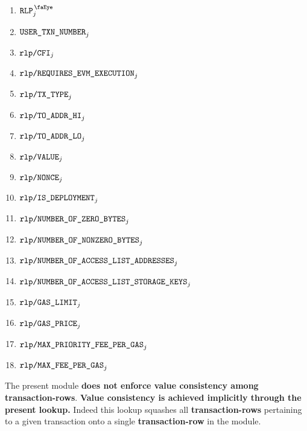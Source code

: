 \begin{description}
\begin{multicols}{2}
			\begin{enumerate}
				\item $\isUserTxnRlpView                        _{j}$
				\item $\texttt{USER}\texttt{\_}\texttt{TXN\_NUMBER}                   _{j}$
				\item $\texttt{rlp}\texttt{/}{\texttt{\texttt{CFI}}}                           _{j}$
				\item $\texttt{rlp}\texttt{/}{\texttt{\texttt{REQUIRES\_EVM\_EXECUTION}}}          _{j}$
				\item $\texttt{rlp}\texttt{/}{\texttt{TX\_TYPE}}                        _{j}$
				\item $\texttt{rlp}\texttt{/}{\texttt{TO\_ADDR\_HI}}                      _{j}$
				\item $\texttt{rlp}\texttt{/}{\texttt{TO\_ADDR\_LO}}                      _{j}$
				\item $\texttt{rlp}\texttt{/}{\texttt{VALUE}}                         _{j}$
				\item $\texttt{rlp}\texttt{/}{\texttt{NONCE}}                         _{j}$
				\item $\texttt{rlp}\texttt{/}{\texttt{IS\_DEPLOYMENT}}                         _{j}$
				\item $\texttt{rlp}\texttt{/}{\texttt{NUMBER\_OF\_ZERO\_BYTES}}             _{j}$
				\item $\texttt{rlp}\texttt{/}{\texttt{NUMBER\_OF\_NONZERO\_BYTES}}          _{j}$
				\item $\texttt{rlp}\texttt{/}{\texttt{NUMBER\_OF\_ACCESS\_LIST\_ADDRESSES}}   _{j}$
				\item $\texttt{rlp}\texttt{/}{\texttt{NUMBER\_OF\_ACCESS\_LIST\_STORAGE\_KEYS}} _{j}$
				\item $\texttt{rlp}\texttt{/}{\texttt{GAS\_LIMIT}}                      _{j}$
				\item $\texttt{rlp}\texttt{/}{\texttt{GAS\_PRICE}}                      _{j}$
				\item $\texttt{rlp}\texttt{/}{\texttt{MAX\_PRIORITY\_FEE\_PER\_GAS}}          _{j}$
				\item $\texttt{rlp}\texttt{/}{\texttt{MAX\_FEE\_PER\_GAS}}                  _{j}$
			\end{enumerate} 
		\end{multicols}
\end{description}
\saNote{}
The present module \textbf{does not enforce value consistency among transaction-rows}.
\textbf{Value consistency is achieved implicitly through the present lookup.}
Indeed this lookup squashes all \textbf{transaction-rows} pertaining to a given transaction
onto a single \textbf{transaction-row} in the \rlpTxnMod{} module.

